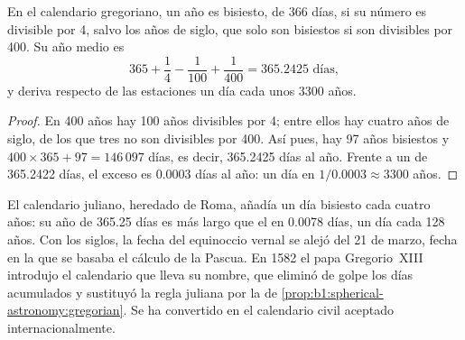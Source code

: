 \begin{proposition}\label{prop:b1:spherical-astronomy:gregorian}
En el calendario gregoriano, un año es bisiesto, de 366 días, si su número es
divisible por 4, salvo los años de siglo, que solo son bisiestos si son divisibles
por 400. Su año medio es
\[
  365 + \frac14 - \frac1{100} + \frac1{400} = \num{365.2425}\text{ días},
\]
y deriva respecto de las estaciones un día cada unos 3300 años.
\end{proposition}

\begin{proof}
En 400 años hay 100 años divisibles por 4; entre ellos hay cuatro años de siglo, de
los que tres no son divisibles por 400. Así pues, hay 97 años bisiestos y
$400\times 365 + 97 = 146\,097$ días, es decir, 365.2425 días al año. Frente a un  de 365.2422 días, el exceso es 0.0003 días al año: un día en
$1/0.0003 \approx 3300$ años.
\end{proof}

\begin{history}[La reforma de 1582]
El calendario juliano, heredado de Roma, añadía un día bisiesto cada cuatro años:
su año de 365.25 días es más largo que el  en 0.0078 días, un día cada
128 años. Con los siglos, la fecha del equinoccio vernal se alejó del 21 de marzo,
fecha en la que se basaba el cálculo de la Pascua. En 1582 el papa Gregorio~XIII
introdujo el calendario que lleva su nombre, que eliminó de golpe los días
acumulados y sustituyó la regla juliana por la de
\cref{prop:b1:spherical-astronomy:gregorian}. Se ha convertido en el calendario
civil aceptado internacionalmente.
\end{history}

